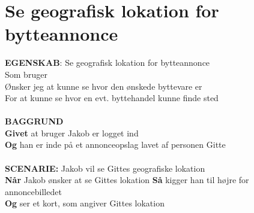 \section{Se geografisk lokation for bytteannonce}
{\color{blue}\textbf{EGENSKAB}:} Se geografisk lokation for bytteannonce \\
Som bruger \\
Ønsker jeg at kunne se hvor den ønskede byttevare er \\
For at kunne se hvor en evt. byttehandel kunne finde sted\\ \\
{\color{blue}\textbf{BAGGRUND}} \\
{\color{blue}\textbf{Givet}} at bruger Jakob er logget ind \\
{\color{blue}\textbf{Og}} han er inde på et annonceopslag lavet af personen Gitte\\\\
{\color{blue}\textbf{SCENARIE:}} Jakob vil se Gittes geografiske lokation \\
{\color{blue}\textbf{Når}} Jakob ønsker at se Gittes lokation
{\color{blue}\textbf{Så}} kigger han til højre for annoncebilledet \\
{\color{blue}\textbf{Og}} ser et kort, som angiver Gittes lokation